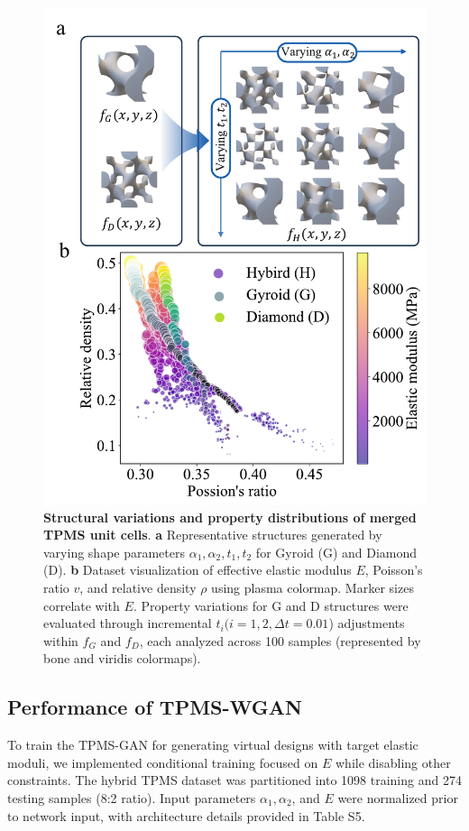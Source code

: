 \documentclass[preprint,review,12pt,authoryear]{elsarticle}
\begin{document}
\begin{figure}
    \centering
    \includegraphics[width=0.75\linewidth]{figures/2.pdf}
    \caption{\textbf{Structural variations and property distributions of merged TPMS unit cells}. \textbf{a} Representative structures generated by varying shape parameters $\alpha_1, \alpha_2,t_1,t_2$ for Gyroid (G) and Diamond (D). \textbf{b} Dataset visualization of effective elastic modulus $E$, Poisson's ratio $v$, and relative density $\rho$ using plasma colormap. Marker sizes correlate with $E$. Property variations for G and D structures were evaluated through incremental $t_i( i=1,2,\Delta t = 0.01$) adjustments within $f_G$ and $f_D$, each analyzed across 100 samples (represented by bone and viridis colormaps).}
    \label{fig:3}
\end{figure}

\subsection{Performance of TPMS-WGAN}
To train the TPMS-GAN for generating virtual designs with target elastic moduli, we implemented conditional training focused on $E$ while disabling other constraints. The hybrid TPMS dataset was partitioned into 1098 training and 274 testing samples (8:2 ratio). Input parameters $\alpha_1, \alpha_2$, and $E$ were normalized prior to network input, with architecture details provided in Table S5.
\end{document}
